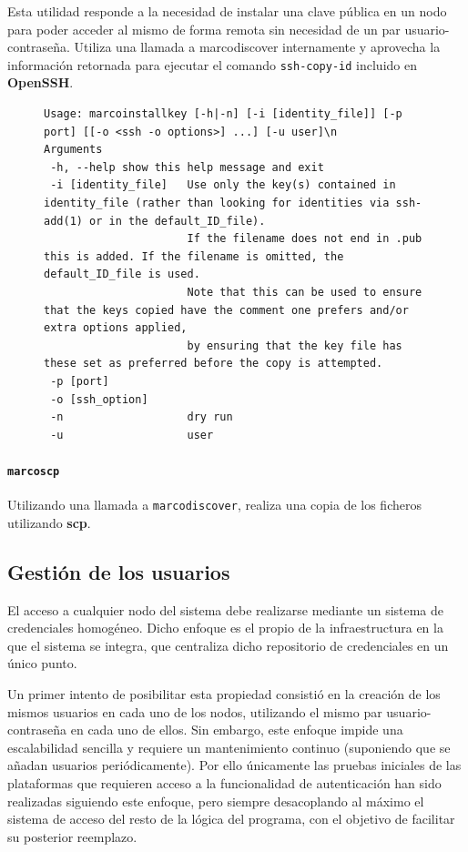 Esta utilidad responde a la necesidad de instalar una clave pública en un nodo para poder acceder al mismo de forma remota sin necesidad de un par usuario-contraseña. Utiliza una llamada a marcodiscover internamente y aprovecha la información retornada para ejecutar el comando \texttt{ssh-copy-id} incluido en \textbf{OpenSSH}.

\begin{figure}[H]
\begin{lstlisting}
Usage: marcoinstallkey [-h|-n] [-i [identity_file]] [-p port] [[-o <ssh -o options>] ...] [-u user]\n
Arguments
 -h, --help	show this help message and exit
 -i [identity_file]   Use only the key(s) contained in identity_file (rather than looking for identities via ssh-add(1) or in the default_ID_file).
                      If the filename does not end in .pub this is added. If the filename is omitted, the default_ID_file is used.
                      Note that this can be used to ensure that the keys copied have the comment one prefers and/or extra options applied,
                      by ensuring that the key file has these set as preferred before the copy is attempted.
 -p [port]
 -o [ssh_option]
 -n                   dry run
 -u                   user

\end{lstlisting}
\end{figure}

\paragraph{\texttt{marcoscp}\\}

Utilizando una llamada a \texttt{marcodiscover}, realiza una copia de los ficheros utilizando \textbf{scp}.


\subsection{Gestión de los usuarios}
\label{gestionusuarios}
El acceso a cualquier nodo del sistema debe realizarse mediante un sistema de credenciales homogéneo. Dicho enfoque es el propio de la infraestructura en la que el sistema se integra, que centraliza dicho repositorio de credenciales en un único punto.

Un primer intento de posibilitar esta propiedad consistió en la creación de los mismos usuarios en cada uno de los nodos, utilizando el mismo par usuario-contraseña en cada uno de ellos. Sin embargo, este enfoque impide una escalabilidad sencilla y requiere un mantenimiento continuo (suponiendo que se añadan usuarios periódicamente). Por ello únicamente las pruebas iniciales de las plataformas que requieren acceso a la funcionalidad de autenticación han sido realizadas siguiendo este enfoque, pero siempre desacoplando al máximo el sistema de acceso del resto de la lógica del programa, con el objetivo de facilitar su posterior reemplazo.

